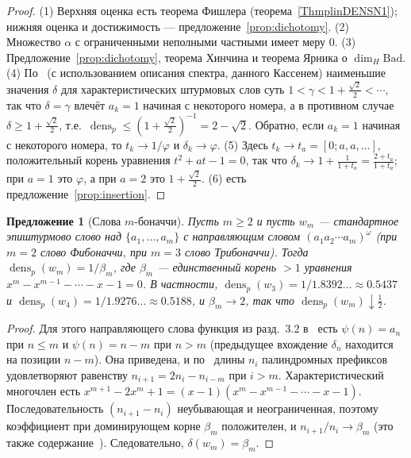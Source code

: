 \documentclass[a4paper,14pt]{extreport}
\theoremstyle{plain}
\newtheorem{proposition}[theorem]{Предложение}
\theoremstyle{definition}
\theoremstyle{remark}
\begin{document}
\begin{proof}
	(1) Верхняя оценка есть теорема Фишлера (теорема~\ref{ThmplinDENSN1}); нижняя оценка и достижимость --- предложение~\ref{prop:dichotomy}.
	(2) Множество $\alpha$ с ограниченными неполными частными имеет меру $0$.
	(3) Предложение~\ref{prop:dichotomy}, теорема Хинчина и теорема Ярника о $\dim_H\mathrm{Bad}$.
	(4) По~\cite[теорема~1.4]{Fischler} (с использованием описания спектра, данного Кассенем) наименьшие значения $\delta$ для характеристических штурмовых слов суть $1<\gamma<1+\frac{\sqrt2}{2}<\cdots$, так что $\delta=\gamma$ влечёт $a_k=1$ начиная с некоторого номера, а в противном случае $\delta\ge1+\frac{\sqrt2}2$, т.е.\ $\operatorname{dens}_p\le(1+\frac{\sqrt2}2)^{-1}=2-\sqrt2$. Обратно, если $a_k=1$ начиная с некоторого номера, то $t_k\to1/\varphi$ и $\delta_k\to\varphi$.
	(5) Здесь $t_k\to t_a=[0;a,a,\dots]$, положительный корень уравнения $t^2+at-1=0$, так что $\delta_k\to1+\frac1{1+t_a}=\frac{2+t_a}{1+t_a}$; при $a=1$ это $\varphi$, а при $a=2$ это $1+\frac{\sqrt2}2$.
	(6) есть предложение~\ref{prop:insertion}.
\end{proof}

\begin{proposition}[Слова $m$-боначчи]\label{prop:mbonacci}
	Пусть $m\ge2$ и пусть $w_m$ --- стандартное эпиштурмово слово над $\{a_1,\dots,a_m\}$ с направляющим словом $(a_1a_2\cdots a_m)^\omega$ (при $m=2$ слово Фибоначчи, при $m=3$ слово Трибоначчи). Тогда $\operatorname{dens}_p(w_m)=1/\beta_m$, где $\beta_m$ --- единственный корень $>1$ уравнения $x^m-x^{m-1}-\cdots-x-1=0$. В частности, $\operatorname{dens}_p(w_3)=1/1.8392\ldots\approx0.5437$ и $\operatorname{dens}_p(w_4)=1/1.9276\ldots\approx0.5188$, и $\beta_m\to2$, так что $\operatorname{dens}_p(w_m)\downarrow\tfrac12$.
\end{proposition}

\begin{proof}
	Для этого направляющего слова функция из разд.~3.2 в~\cite{Fischler} есть $\psi(n)=a_n$ при $n\le m$ и $\psi(n)=n-m$ при $n>m$ (предыдущее вхождение $\delta_n$ находится на позиции $n-m$). Она приведена, и по~\cite[теорема~4.12]{Fischler} длины $n_i$ палиндромных префиксов удовлетворяют равенству $n_{i+1}=2n_i-n_{i-m}$ при $i>m$. Характеристический многочлен есть $x^{m+1}-2x^m+1=(x-1)(x^m-x^{m-1}-\cdots-x-1)$. Последовательность $(n_{i+1}-n_i)$ неубывающая и неограниченная, поэтому коэффициент при доминирующем корне $\beta_m$ положителен, и $n_{i+1}/n_i\to\beta_m$ (это также содержание~\cite[предложение~6.2]{Fischler}). Следовательно, $\delta(w_m)=\beta_m$.
\end{proof}
\end{document}
